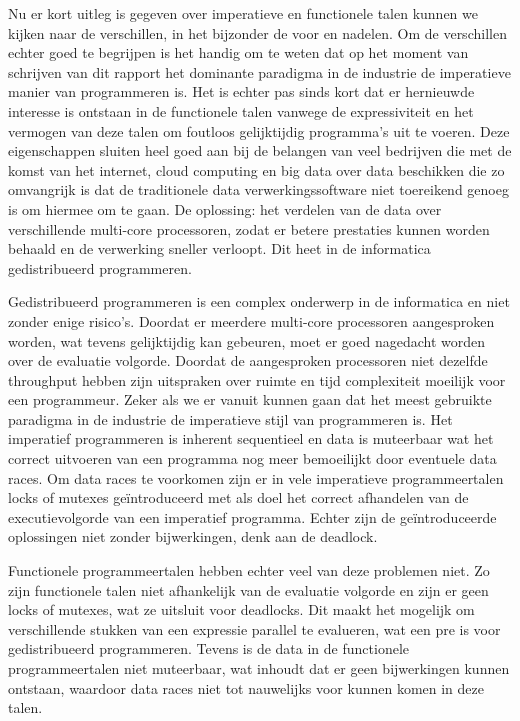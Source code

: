 \documentclass[twoside,twocolumn]{article}
\begin{document}
Nu er kort uitleg is gegeven over imperatieve en functionele talen kunnen we
kijken naar de verschillen, in het bijzonder de voor en nadelen. Om de
verschillen echter goed te begrijpen is het handig om te weten dat op het
moment van schrijven van dit rapport het dominante paradigma in de industrie de
imperatieve manier van programmeren is. Het is echter pas sinds kort dat er
hernieuwde interesse is ontstaan in de functionele talen vanwege de
expressiviteit en het vermogen van deze talen om foutloos gelijktijdig
programma's uit te voeren. Deze eigenschappen sluiten heel goed aan bij de
belangen van veel bedrijven die met de komst van het internet,
cloud computing en big data over data beschikken die zo omvangrijk is dat
de traditionele data verwerkingssoftware niet toereikend genoeg is om hiermee
om te gaan. De oplossing: het verdelen van de data over verschillende
multi-core processoren, zodat er betere prestaties kunnen worden behaald en de
verwerking sneller verloopt. Dit heet in de informatica gedistribueerd
programmeren.

Gedistribueerd programmeren is een complex onderwerp in de informatica en niet
zonder enige risico's. Doordat er meerdere multi-core processoren aangesproken
worden, wat tevens gelijktijdig kan gebeuren, moet er goed nagedacht worden
over de evaluatie volgorde. Doordat de aangesproken processoren niet dezelfde
throughput hebben zijn uitspraken over ruimte en tijd complexiteit moeilijk
voor een programmeur. Zeker als we er vanuit kunnen gaan dat het meest
gebruikte paradigma in de industrie de imperatieve stijl van programmeren is.
Het imperatief programmeren is inherent sequentieel en data is muteerbaar wat
het correct uitvoeren van een programma nog meer bemoeilijkt door eventuele
data races. Om data races te voorkomen zijn er in vele imperatieve
programmeertalen locks of mutexes ge\"introduceerd met als doel het correct
afhandelen van de executievolgorde van een imperatief programma. Echter zijn de
ge\"introduceerde oplossingen niet zonder bijwerkingen, denk aan de deadlock.

Functionele programmeertalen hebben echter veel van deze problemen niet. Zo
zijn functionele talen niet afhankelijk van de evaluatie volgorde en zijn er
geen locks of mutexes, wat ze uitsluit voor deadlocks. Dit maakt het
mogelijk om verschillende stukken van een expressie parallel te evalueren,
wat een pre is voor gedistribueerd programmeren. Tevens is de data in de
functionele programmeertalen niet muteerbaar, wat inhoudt dat er geen
bijwerkingen kunnen ontstaan, waardoor data races niet tot nauwelijks voor
kunnen komen in deze talen.
\end{document}
